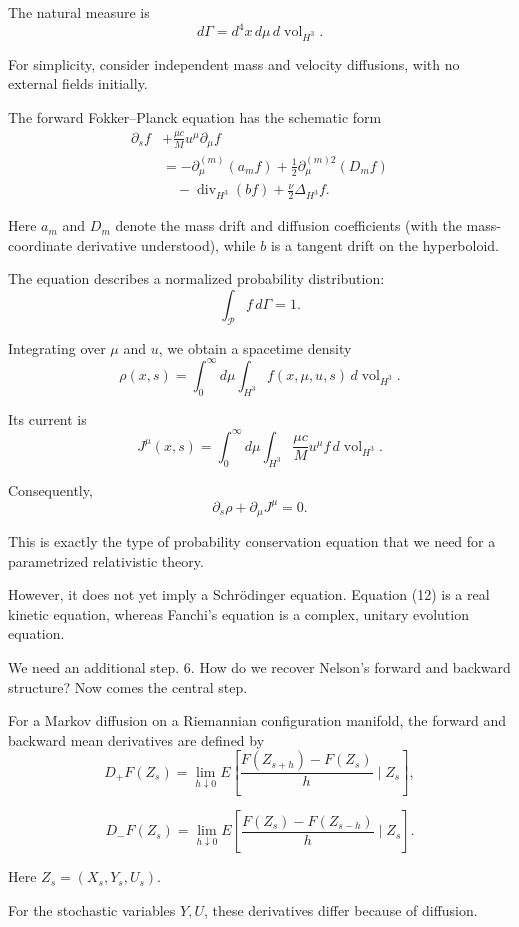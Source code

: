 The natural measure is
\[
d\Gamma=d^4x\,d\mu\,d\operatorname{vol}_{H^3}.
\]

For simplicity, consider independent mass and velocity diffusions, with no external fields initially.

The forward Fokker–Planck equation has the schematic form
\[
\boxed{
\begin{aligned}
\partial_s f
&+
\frac{\mu c}{M}u^\mu\partial_\mu f\\
&=
-\partial_\mu^{(m)}(a_m f)
+\frac12\partial_\mu^{(m)2}(D_m f)
\\
&\quad
-\operatorname{div}_{H^3}(b f)
+\frac{\nu}{2}\Delta_{H^3}f.
\end{aligned}
}
\tag{12}
\]

Here \(a_m\) and \(D_m\) denote the mass drift and diffusion coefficients (with the mass-coordinate derivative understood), while \(b\) is a tangent drift on the hyperboloid.

The equation describes a normalized probability distribution:
\[
\int_{\mathcal P} f\,d\Gamma=1.
\]

Integrating over \(\mu\) and \(u\), we obtain a spacetime density
\[
\rho(x,s)=
\int_0^\infty d\mu
\int_{H^3} f(x,\mu,u,s)\,d\operatorname{vol}_{H^3}.
\]

Its current is
\[
J^\mu(x,s)=
\int_0^\infty d\mu
\int_{H^3}
\frac{\mu c}{M}u^\mu f\,
d\operatorname{vol}_{H^3}.
\]

Consequently,
\[
\boxed{
\partial_s\rho+\partial_\mu J^\mu=0.
}
\tag{13}
\]

This is exactly the type of probability conservation equation that we need for a parametrized relativistic theory.

However, it does not yet imply a Schrödinger equation. Equation (12) is a real kinetic equation, whereas Fanchi's equation is a complex, unitary evolution equation.

We need an additional step.
6. How do we recover Nelson's forward and backward structure?
Now comes the central step.

For a Markov diffusion on a Riemannian configuration manifold, the forward and backward mean derivatives are defined by
\[
D_+F(Z_s)
=
\lim_{h\downarrow0}
E\left[
\frac{F(Z_{s+h})-F(Z_s)}{h}
\mid Z_s
\right],
\]

\[
D_-F(Z_s)
=
\lim_{h\downarrow0}
E\left[
\frac{F(Z_s)-F(Z_{s-h})}{h}
\mid Z_s
\right].
\]

Here \(Z_s=(X_s,Y_s,U_s)\).

For the stochastic variables \(Y,U\), these derivatives differ because of diffusion.


